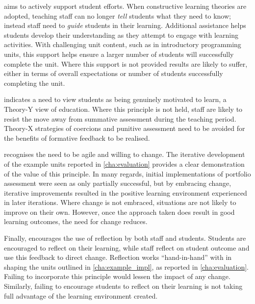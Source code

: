  aims to actively support student efforts. When constructive learning theories are adopted, teaching staff can no longer \emph{tell} students what they need to know; instead staff need to \emph{guide} students in their learning. Additional assistance helps students develop their understanding as they attempt to engage with learning activities. With challenging unit content, such as in introductory programming units, this support helps ensure a larger number of students will successfully complete the unit. Where this support is not provided results are likely to suffer, either in terms of overall expectations or number of students successfully completing the unit. 

 indicates a need to view students as being genuinely motivated to learn, a Theory-Y view of education. Where this principle is not held, staff are likely to resist the move away from summative assessment during the teaching period. Theory-X strategies of coercions and punitive assessment need to be avoided for the benefits of formative feedback to be realised.

 recognises the need to be agile and willing to change. The iterative development of the example units reported in \cref{cha:evaluation} provides a clear demonstration of the value of this principle. In many regards, initial implementations of portfolio assessment were seen as only partially successful, but by embracing change, iterative improvements resulted in the positive learning environment experienced in later iterations. Where change is not embraced, situations are not likely to improve on their own. However, once the approach taken does result in good learning outcomes, the need for change reduces.    

Finally,  encourages the use of reflection by both staff and students. Students are encouraged to reflect on their learning, while staff reflect on student outcome and use this feedback to direct change. Reflection works ``hand-in-hand'' with  in shaping the units outlined in \cref{cha:example_impl}, as reported in \cref{cha:evaluation}. Failing to incorporate this principle would lessen the impact of any change. Similarly, failing to encourage students to reflect on their learning is not taking full advantage of the learning environment created.



